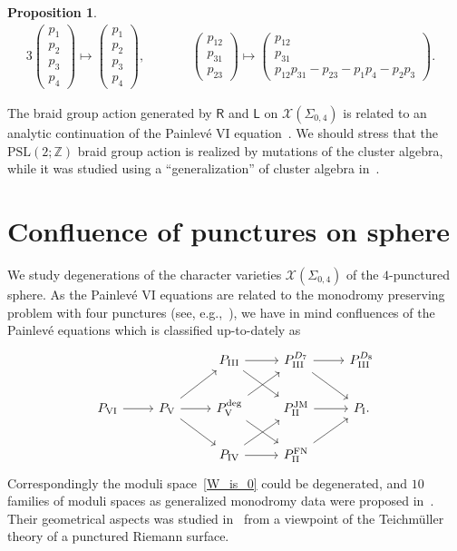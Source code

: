\documentclass[pdftex]{sigma}
\numberwithin{equation}{section}
\newtheorem{Proposition}[Theorem]{Proposition}
 { \theoremstyle{definition}
\newtheorem{Definition}[Theorem]{Definition}
\newtheorem{Note}[Theorem]{Note}
\newtheorem{Example}[Theorem]{Example}
\newtheorem{Remark}[Theorem]{Remark} }
\begin{document}
\begin{Proposition}
\begin{alignat*}{3}
\begin{pmatrix}
 p_1 \\ p_2 \\ p_3 \\ p_4
 \end{pmatrix}
 \mapsto
 \begin{pmatrix}
 p_1 \\ p_2 \\ p_3 \\ p_4
 \end{pmatrix} ,
 \qquad &&
 \begin{pmatrix}
 p_{12} \\ p_{31} \\ p_{23}
 \end{pmatrix}
 \mapsto
 \begin{pmatrix}
 p_{12} \\ p_{31} \\
 p_{12} p_{31} - p_{23}
 - p_1 p_4 - p_2 p_3
 \end{pmatrix} .&
\end{alignat*}
\end{Proposition}

The braid group action generated by $\mathsf{R}$ and $\mathsf{L}$ on $\mathcal{X}(\Sigma_{0,4})$ is related to an analytic continuation of the Painlev{\'e} VI equation~\cite{Iwasaki02a, Iwasaki03a}. We should stress that the $\mathrm{PSL}(2;\mathbb{Z})$ braid group action is realized by mutations of the cluster algebra, while it was studied using a ``generalization'' of cluster algebra in~\cite{ChekhShapi14a}.

\section{Confluence of punctures on sphere}\label{sec:confluence}
 We study degenerations of the character varieties $\mathcal{X}(\Sigma_{0,4})$ of the $4$-punctured sphere. As the Painlev{\'e} VI equations are related to the monodromy preserving problem with four punctures (see, e.g.,~\cite{MJimb82a}), we have in mind confluences of the Painlev{\'e} equations which is classified up-to-dately as~\cite{OhyamOkumu06a}
\begin{equation} \label{Painleve_confluence}
 \begin{tikzcd}
 & &
 P_{\mathrm{III}} \arrow[r] \arrow[dr] &
 P_{\mathrm{III}}^{D_7} \arrow[r] \arrow[dr]&
 P_{\mathrm{III}}^{D_8}
 \\
 P_{\mathrm{VI}}
 \arrow[r] &
 P_{\mathrm{V}}
 \arrow[ur] \arrow[r] \arrow[dr] &
 P_{\mathrm{V}}^{\text{deg}} \arrow[ur] \arrow{rd}&
 P_{\mathrm{II}}^{\text{JM}} \arrow[r] &
 P_{\mathrm{I}}.
 \\
 & &
 P_{\mathrm{IV}} \arrow[ur] \arrow[r] &
 P_{\mathrm{II}}^{\text{FN}} \arrow[ur] &
 \end{tikzcd}
\end{equation}
Correspondingly the moduli space~\eqref{W_is_0} could be degenerated, and $10$ families of moduli spaces as generalized monodromy data were proposed in~\cite{vdPutSaito09a}. Their geometrical aspects was studied in~\cite{ChekMazzRubt15a} from a viewpoint of the Teichm{\"u}ller theory of a punctured Riemann surface.
\end{document}
